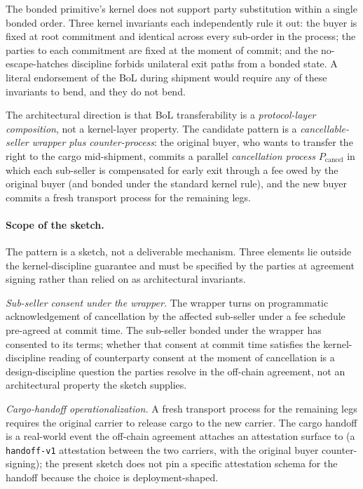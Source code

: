 \documentclass[11pt,a4paper]{article}
\theoremstyle{definition}
\theoremstyle{remark}
\begin{document}
The bonded primitive's kernel does not support party substitution
within a single bonded order. Three kernel invariants each
independently rule it out: the buyer is fixed at root commitment
and identical across every sub-order in the process; the parties
to each commitment are fixed at the moment of commit; and the
no-escape-hatches discipline forbids unilateral exit paths from a
bonded state. A literal endorsement of the BoL during shipment
would require any of these invariants to bend, and they do not
bend.

The architectural direction is that BoL transferability is a
\emph{protocol-layer composition}, not a kernel-layer property.
The candidate pattern is a \emph{cancellable-seller wrapper plus
counter-process}: the original buyer, who wants to transfer the
right to the cargo mid-shipment, commits a parallel
\emph{cancellation process} $P_{\text{cancel}}$ in which each
sub-seller is compensated for early exit through a fee owed by
the original buyer (and bonded under the standard kernel rule),
and the new buyer commits a fresh transport process for the
remaining legs.

\paragraph{Scope of the sketch.}
The pattern is a sketch, not a deliverable mechanism. Three
elements lie outside the kernel-discipline guarantee and must be
specified by the parties at agreement signing rather than relied
on as architectural invariants.

\emph{Sub-seller consent under the wrapper.} The wrapper turns
on programmatic acknowledgement of cancellation by the affected
sub-seller under a fee schedule pre-agreed at commit time. The
sub-seller bonded under the wrapper has consented to its terms;
whether that consent at commit time satisfies the
kernel-discipline reading of counterparty consent at the moment
of cancellation is a design-discipline question the parties
resolve in the off-chain agreement, not an architectural
property the sketch supplies.

\emph{Cargo-handoff operationalization.} A fresh transport
process for the remaining legs requires the original carrier to
release cargo to the new carrier. The cargo handoff is a
real-world event the off-chain agreement attaches an attestation
surface to (a \texttt{handoff-v1} attestation between the two
carriers, with the original buyer counter-signing); the present
sketch does not pin a specific attestation schema for the
handoff because the choice is deployment-shaped.
\end{document}
